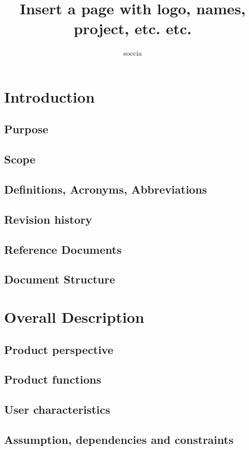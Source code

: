 \documentclass[12pt,a4paper]{article}
\title{Insert a page with logo, names, project, etc. etc.}
\author{soccia}
\begin{document}
\maketitle

\newpage



\section{Introduction}\label{sec:intro}
\subsection{Purpose}
\subsection{Scope}
\subsection{Definitions, Acronyms, Abbreviations}
\subsection{Revision history}
\subsection{Reference Documents}
\subsection{Document Structure}
\section{Overall Description}
\subsection{Product perspective}
\subsection{Product functions}
\subsection{User characteristics}
\subsection{Assumption, dependencies and constraints}
\end{document}
